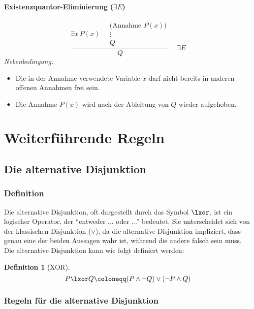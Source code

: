 \documentclass{book}
\theoremstyle{plain}
\theoremstyle{remark}
\theoremstyle{definition}
\newtheorem{definition}{Definition}[section]
\begin{document}
\paragraph{Existenzquantor-Eliminierung ($\exists E$)}
\[
\frac{
\exists x\,P(x) 
\quad
\begin{array}{c}
\text{(Annahme }P(x)\text{)}\\
\vdots \\
Q
\end{array}
}{Q}
\quad \exists E
\]
\emph{Nebenbedingung:}
\begin{itemize}
    \item Die in der Annahme verwendete Variable $x$ darf nicht bereits in anderen offenen Annahmen frei sein.
    \item Die Annahme $P(x)$ wird nach der Ableitung von $Q$ wieder aufgehoben.
\end{itemize}













\section{Weiterführende Regeln}
\subsection{Die alternative Disjunktion}
\subsubsection{Definition}


Die alternative Disjunktion, oft dargestellt durch das Symbol \(\lxor\), ist ein logischer Operator, der "`entweder ... oder ..."' bedeutet. Sie unterscheidet sich von der klassischen Disjunktion (\(\lor\)), da die alternative Disjunktion impliziert, dass genau eine der beiden Aussagen wahr ist, während die andere falsch sein muss. Die alternative Disjunktion kann wie folgt definiert werden:

\begin{definition}[XOR]
\label{XOr}
\[
P \lxor Q \coloneqq (P \land \neg Q) \lor (\neg P \land Q)
\]
\end{definition}

\subsubsection{Regeln für die alternative Disjunktion}
\end{document}

